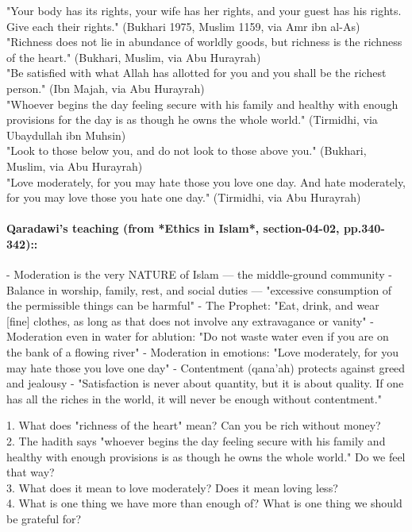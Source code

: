 \documentclass[11pt,a4paper]{article}
\begin{document}
\begin{hadithbox} "Your body has its rights, your wife has her rights, and your guest has his rights. Give each their rights." (Bukhari 1975, Muslim 1159, via Amr ibn al-As) \\ "Richness does not lie in abundance of worldly goods, but richness is the richness of the heart." (Bukhari, Muslim, via Abu Hurayrah) \\ "Be satisfied with what Allah has allotted for you and you shall be the richest person." (Ibn Majah, via Abu Hurayrah) \\ "Whoever begins the day feeling secure with his family and healthy with enough provisions for the day is as though he owns the whole world." (Tirmidhi, via Ubaydullah ibn Muhsin) \\ "Look to those below you, and do not look to those above you." (Bukhari, Muslim, via Abu Hurayrah) \\ "Love moderately, for you may hate those you love one day. And hate moderately, for you may love those you hate one day." (Tirmidhi, via Abu Hurayrah) \end{hadithbox}

\paragraph*{Qaradawi's teaching (from *Ethics in Islam*, section-04-02, pp.340-342)::}  - Moderation is the very NATURE of Islam --- the middle-ground community - Balance in worship, family, rest, and social duties --- "excessive consumption of the permissible things can be harmful" - The Prophet: "Eat, drink, and wear [fine] clothes, as long as that does not involve any extravagance or vanity" - Moderation even in water for ablution: "Do not waste water even if you are on the bank of a flowing river" - Moderation in emotions: "Love moderately, for you may hate those you love one day" - Contentment (qana'ah) protects against greed and jealousy - "Satisfaction is never about quantity, but it is about quality. If one has all the riches in the world, it will never be enough without contentment."

\begin{discussionbox} 1. What does "richness of the heart" mean? Can you be rich without money? \\ 2. The hadith says "whoever begins the day feeling secure with his family and healthy with enough provisions is as though he owns the whole world." Do we feel that way? \\ 3. What does it mean to love moderately? Does it mean loving less? \\ 4. What is one thing we have more than enough of? What is one thing we should be grateful for? \end{discussionbox}
\end{document}
